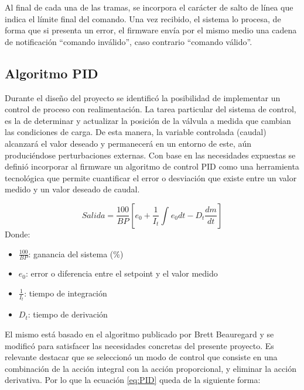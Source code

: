 Al final de cada una de las tramas, se incorpora el carácter de salto de línea que indica el límite final del comando. Una vez recibido, el sistema lo procesa, de forma que si presenta un error, el firmware envía por el mismo medio una cadena de notificación “comando inválido”, caso contrario “comando válido”. 

\subsection{Algoritmo PID}
\label{subsec:Algoritmo PID}

Durante el diseño del proyecto se identificó la posibilidad de implementar un control de proceso con realimentación. La tarea particular del sistema de control, es la de determinar y actualizar la posición de la válvula a medida que cambian las condiciones de carga. De esta manera, la variable controlada (caudal) alcanzará el valor deseado y permanecerá en un entorno de este, aún produciéndose perturbaciones externas. Con base en las necesidades expuestas se definió incorporar al firmware un algoritmo de control PID como una herramienta tecnológica que permite cuantificar el error o desviación que existe entre un valor medido y un valor deseado de caudal. 

\begin{equation}
 \label{eq:PID}
Salida =  \frac{100}{BP} [e_{0}+ \frac{1}{I_{t}} \int_{}^{} e_{0} dt - D_{t} \frac{dm}{dt}]
\end{equation}
Donde:\\ 
\begin{itemize}


\item $\frac{100}{BP}$: ganancia del sistema (\%) 
\item ${e_{0}}$:  error o diferencia entre el setpoint y el valor medido 
\item $\frac{1}{I_{t}}$: tiempo de integración
\item ${D_{t}}$: tiempo de derivación


\end{itemize}


El mismo está basado en el algoritmo publicado por Brett Beauregard \citep{ALGORITMOPID} y se modificó para satisfacer las necesidades concretas del presente proyecto. Es relevante destacar que se seleccionó un modo de control que consiste en una combinación de la acción integral con la acción proporcional, y eliminar la acción derivativa. Por lo que la ecuación \ref{eq:PID} queda de la siguiente forma:
   
